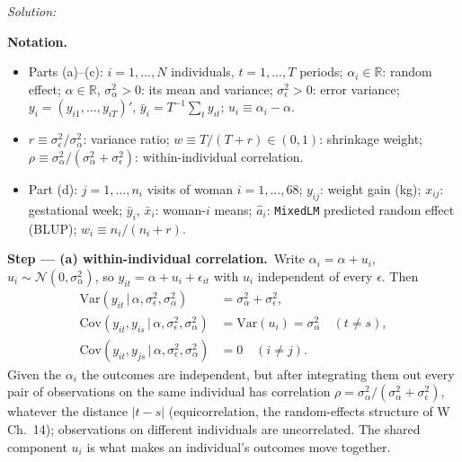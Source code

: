 \documentclass[11pt,a4paper]{article}
\newif\ifsolucoes
\newcommand{\espacoresol}{2.5cm}   %
\numberwithin{equation}{questao}
\newenvironment{notacao}{\par\smallskip\noindent\textbf{Notation.}\begin{itemize}[leftmargin=1.4em,topsep=1pt,itemsep=0pt]\small}{\end{itemize}}
\newcommand{\resolespaco}{\ifsolucoes\else\par\textit{Solution:}\vspace{\espacoresol}\par\fi}
\newcommand{\passo}[2]{\par\smallskip\noindent\textbf{Step --- #1.}~#2}
\newcommand{\N}{\mathcal{N}}
\begin{document}
\resolespaco
\begin{sol}
\begin{notacao}
\item Parts (a)--(c): $i=1,\dots,N$ individuals, $t=1,\dots,T$ periods; $\alpha_i\in\mathbb{R}$: random effect; $\alpha\in\mathbb{R}$, $\sigma_\alpha^2>0$: its mean and variance; $\sigma_\epsilon^2>0$: error variance; $y_i=(y_{i1},\dots,y_{iT})'$, $\bar y_i=T^{-1}\sum_ty_{it}$; $u_i\equiv\alpha_i-\alpha$.
\item $r\equiv\sigma_\epsilon^2/\sigma_\alpha^2$: variance ratio; $w\equiv T/(T+r)\in(0,1)$: shrinkage weight; $\rho\equiv\sigma_\alpha^2/(\sigma_\alpha^2+\sigma_\epsilon^2)$: within-individual correlation.
\item Part (d): $j=1,\dots,n_i$ visits of woman $i=1,\dots,68$; $y_{ij}$: weight gain (kg); $x_{ij}$: gestational week; $\bar y_i$, $\bar x_i$: woman-$i$ means; $\hat a_i$: \texttt{MixedLM} predicted random effect (BLUP); $w_i\equiv n_i/(n_i+r)$.
\end{notacao}

\passo{(a) within-individual correlation}{Write $\alpha_i=\alpha+u_i$, $u_i\sim\N(0,\sigma_\alpha^2)$, so
$y_{it}=\alpha+u_i+\epsilon_{it}$ with $u_i$ independent of every $\epsilon$. Then
\begin{align*}
\mathrm{Var}(y_{it}\,|\,\alpha,\sigma_\epsilon^2,\sigma_\alpha^2)&=\sigma_\alpha^2+\sigma_\epsilon^2,\\
\mathrm{Cov}(y_{it},y_{is}\,|\,\alpha,\sigma_\epsilon^2,\sigma_\alpha^2)&=\mathrm{Var}(u_i)=\sigma_\alpha^2\quad(t\ne s),\\
\mathrm{Cov}(y_{it},y_{js}\,|\,\alpha,\sigma_\epsilon^2,\sigma_\alpha^2)&=0\quad(i\ne j).
\end{align*}
Given the $\alpha_i$ the outcomes are independent, but after integrating them out every pair of observations on the
same individual has correlation $\rho=\sigma_\alpha^2/(\sigma_\alpha^2+\sigma_\epsilon^2)$, whatever the distance $|t-s|$
(equicorrelation, the random-effects structure of W Ch.~14); observations on different individuals are uncorrelated.
The shared component $u_i$ is what makes an individual's outcomes move together.}


\end{sol}
\end{document}

